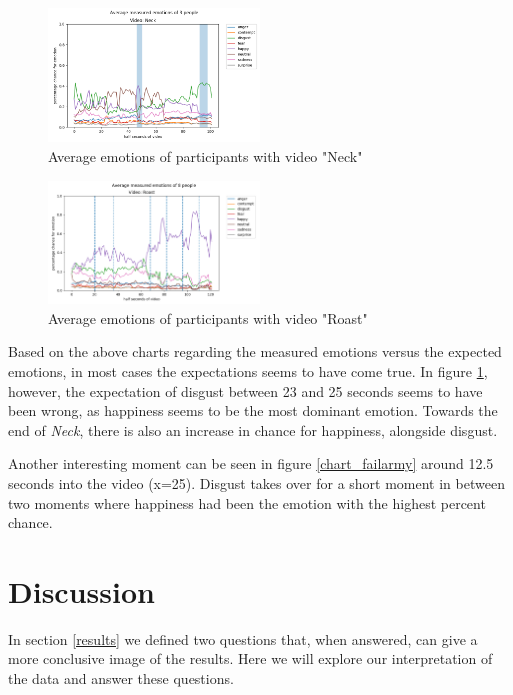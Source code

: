 \documentclass[sigconf]{acmart}
\begin{document}
\begin{figure}[H]
    \centering
    \includegraphics[width=0.5\textwidth, scale=1]{chart_neck_small.png}
    \caption{Average emotions of participants with video "Neck"}
    \label{chart_neck}
\end{figure}

\begin{figure}[H]
    \centering
    \includegraphics[width=0.5\textwidth, scale=1]{chart_roast_small.png}
    \caption{Average emotions of participants with video "Roast"}
    \label{chart_roast}
\end{figure}

Based on the above charts regarding the measured emotions versus the expected emotions, in most cases the
expectations seems to have come true. In figure \ref{chart_neck}, however, the expectation of disgust between
23 and 25 seconds seems to have been wrong, as happiness seems to be the most dominant emotion. Towards the end
of \emph{Neck}, there is also an increase in chance for happiness, alongside disgust.

Another interesting moment can be seen in figure \ref{chart_failarmy} around 12.5 seconds into the video (x=25).
Disgust takes over for a short moment in between two moments where happiness had been the emotion with the
highest percent chance.


\section{Discussion}
In section \ref{results} we defined two questions that, when answered, can give a more conclusive image of the
results. Here we will explore our interpretation of the data and answer these questions.
\end{document}
